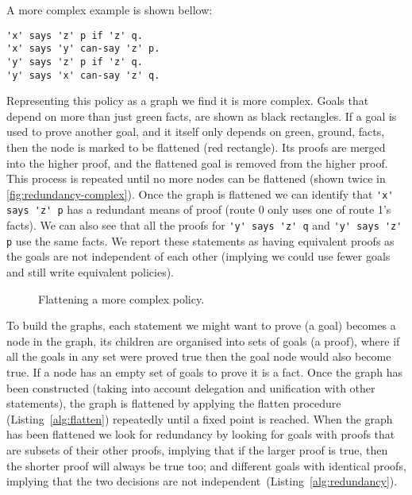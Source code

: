 \documentclass[a4paper]{scrartcl}
\begin{document}
A more complex example is shown bellow:
\begin{lstlisting}
'x' says 'z' p if 'z' q.
'x' says 'y' can-say 'z' p.
'y' says 'z' p if 'z' q.
'y' says 'x' can-say 'z' q.
\end{lstlisting}
Representing this policy as a graph we find it is more complex. Goals that
depend on more than just green facts, are shown as black rectangles.  If a goal
is used to prove another goal, and it itself only depends on green, ground,
facts, then the node is marked to be flattened (red rectangle).  Its proofs are
merged into the higher proof, and the flattened goal is removed from the higher
proof.  This process is repeated until no more nodes can be flattened (shown
twice in \autoref{fig:redundancy-complex}).  Once the graph is flattened we can
identify that \lstinline!'x' says 'z' p! has a redundant means of proof (route
0 only uses one of route 1's facts).  We can also see that all the proofs for
\lstinline!'y' says 'z' q! and \lstinline!'y' says 'z' p! use the same facts.
We report these statements as having equivalent proofs as the goals are not
independent of each other (implying we could use fewer goals and still write
equivalent policies).
\begin{figure}
  \centering\tiny
  \caption{Flattening a more complex policy.}
  \label{fig:redundancy-complex}
\end{figure}

To build the graphs, each statement we might want to prove (a goal) becomes a
node in the graph, its children are organised into sets of goals (a proof),
where if all the goals in any set were proved true then the goal node would also
become true. If a node has an empty set of goals to prove it is a fact. Once the
graph has been constructed (taking into account delegation and unification with
other statements), the graph is flattened by applying the flatten procedure
(Listing~\ref{alg:flatten}) repeatedly until a fixed point is reached. When the
graph has been flattened we look for redundancy by looking for goals with proofs
that are subsets of their other proofs, implying that if the larger proof is
true, then the shorter proof will always be true too; and different goals with
identical proofs, implying that the two decisions are not
independent~(Listing~\ref{alg:redundancy}).
\end{document}

